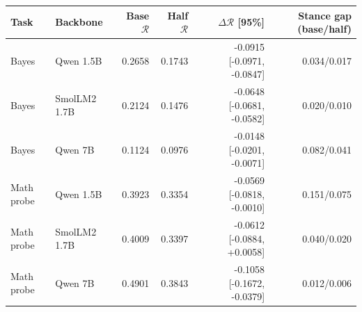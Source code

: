 \begin{tabular}{llrrrr}
\toprule
Task & Backbone & Base $\mathcal R$ & Half $\mathcal R$ & $\Delta\mathcal R$ [95\%] & Stance gap (base/half)\\
\midrule
Bayes & Qwen 1.5B & 0.2658 & 0.1743 & -0.0915 [-0.0971, -0.0847] & 0.034/0.017\\
Bayes & SmolLM2 1.7B & 0.2124 & 0.1476 & -0.0648 [-0.0681, -0.0582] & 0.020/0.010\\
Bayes & Qwen 7B & 0.1124 & 0.0976 & -0.0148 [-0.0201, -0.0071] & 0.082/0.041\\
\midrule
Math probe & Qwen 1.5B & 0.3923 & 0.3354 & -0.0569 [-0.0818, -0.0010] & 0.151/0.075\\
Math probe & SmolLM2 1.7B & 0.4009 & 0.3397 & -0.0612 [-0.0884, +0.0058] & 0.040/0.020\\
Math probe & Qwen 7B & 0.4901 & 0.3843 & -0.1058 [-0.1672, -0.0379] & 0.012/0.006\\
\bottomrule
\end{tabular}
